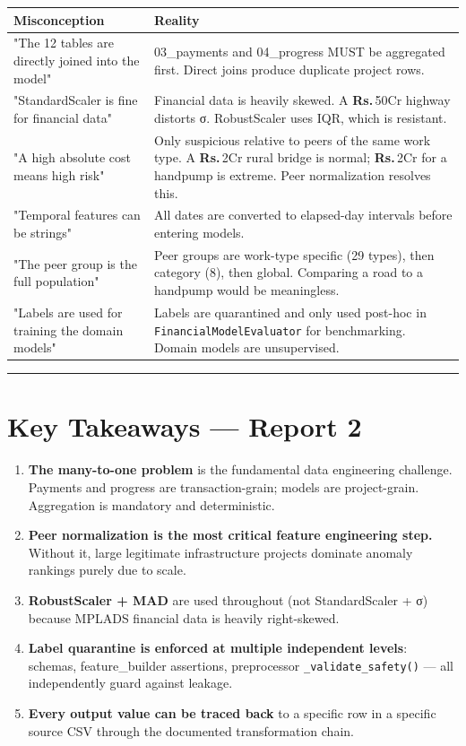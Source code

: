\documentclass[11pt,a4paper]{article}
\DeclareRobustCommand{\INR}{\textbf{Rs.\,}}
\DeclareRobustCommand{\INR}{₹}
\begin{document}
\begin{table}[htbp]
\centering
\small
\begin{tabularx}{\textwidth}{l Y}
\toprule
\textbf{Misconception} & \textbf{Reality} \\
\midrule
"The 12 tables are directly joined into the model" & 03\_payments and 04\_progress MUST be aggregated first. Direct joins produce duplicate project rows. \\
"StandardScaler is fine for financial data" & Financial data is heavily skewed. A \INR{}50Cr highway distorts σ. RobustScaler uses IQR, which is resistant. \\
"A high absolute cost means high risk" & Only suspicious relative to peers of the same work type. A \INR{}2Cr rural bridge is normal; \INR{}2Cr for a handpump is extreme. Peer normalization resolves this. \\
"Temporal features can be strings" & All dates are converted to elapsed-day intervals before entering models. \\
"The peer group is the full population" & Peer groups are work-type specific (29 types), then category (8), then global. Comparing a road to a handpump would be meaningless. \\
"Labels are used for training the domain models" & Labels are quarantined and only used post-hoc in \texttt{FinancialModelEvaluator} for benchmarking. Domain models are unsupervised. \\
\bottomrule
\end{tabularx}
\end{table}


\vspace{1em}\hrule\vspace{1em}

\section{Key Takeaways --- Report 2}

\begin{enumerate}[leftmargin=1.5em, itemsep=2pt, topsep=3pt]
\item \textbf{The many-to-one problem} is the fundamental data engineering challenge. Payments and progress are transaction-grain; models are project-grain. Aggregation is mandatory and deterministic.
\item \textbf{Peer normalization is the most critical feature engineering step.} Without it, large legitimate infrastructure projects dominate anomaly rankings purely due to scale.
\item \textbf{RobustScaler + MAD} are used throughout (not StandardScaler + σ) because MPLADS financial data is heavily right-skewed.
\item \textbf{Label quarantine is enforced at multiple independent levels}: schemas, feature\_builder assertions, preprocessor \texttt{\_validate\_safety()} --- all independently guard against leakage.
\item \textbf{Every output value can be traced back} to a specific row in a specific source CSV through the documented transformation chain.
\end{enumerate}
\end{document}
